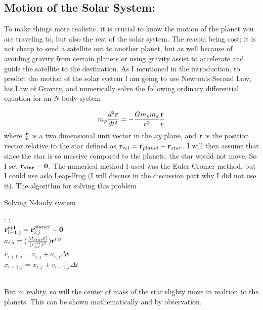 \documentclass[a4paper,11pt,english]{report}
\begin{document}
\newpage
\subsection{Motion of the Solar System:} To make things more realistic, it
is crucial to know the motion of the planet you are traveling to, but also the
rest of the solar system. The reason being cost; it is not cheap to send a satellite out
to another planet, but as well because of avoiding gravity from certain planets
or using gravity assist to accelerate and guide the satellite to the destination.
As I mentioned in the introduction, to predict the motion of
the solar system I am going to use Newton's Second Law, his Law of Gravity,
and numerically solve the following ordinary differential equation for an
\(N\)-body system

\begin{align}
  m_{p}\frac{d^{2}\bold{r}}{dt^{2}} = - \frac{Gm_{p}m_{s}}{r^{2}}\frac{\bold{r}}{r}
\end{align}
where \(\frac{\bold{r}}{r}\) is a two dimensional unit vector in the  \(xy\) plane, and \(\bold{r}\)
is the position vector relative to the star defined as \(\bold{r}_{rel} =
\bold{r}_{planet} - \bold{r}_{star}\). I will then assume that since the star
is so massive compared to the planets, the star would not move. So I set
\(\bold{r_{star} = \bold{0}}\). The numerical method I used was the Euler-Cromer
method, but I could use aslo Leap-Frog (I will discuss in the discussion part why I
did not use it). The algorithm for solving this problem
\begin{algorithm}
  \caption{Solving N-body system}\label{euclid}
  \begin{algorithmic}[1]
    :
    :
    \\
    \State \(\bold{r^{rel}_{i+1,j}} = \bold{r}^{planet}_{i,j} - \bold{0}\)
    \\
    \State \(a_{i,j} = (\frac{M_{star}G}{(r^{rel}_{i,j})^{3}})\bold{r}^{rel}\)
    \\
    \State $v_{i+1,j} = v_{i,j} + a_{i,j}\Delta t$.
    \\
    \State \(x_{i+1,j} = x_{i,j} + v_{i+1,j}\Delta t\)
    \EndFor
    \EndFor
  \end{algorithmic}
\end{algorithm}
\\
But in reality, so will the center of mass of the star slighty move in realtion
to the planets. This can be shown mathematically and by observation.
\end{document}
